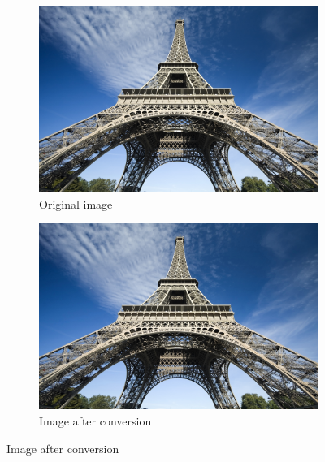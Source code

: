 \documentclass[12pt]{article}
\begin{document}
\begin{figure}[H]
  \centering
  \begin{subfigure}{.45\textwidth}
    \includegraphics[width=\linewidth]{./img/in.jpg}
    \caption{Original image}
  \end{subfigure}
  \hspace{1cm}
  \begin{subfigure}{.45\textwidth}
    \includegraphics[width=\linewidth]{./img/out.jpg}
    \caption{Image after conversion}
  \end{subfigure}
\end{figure}
\end{document}
